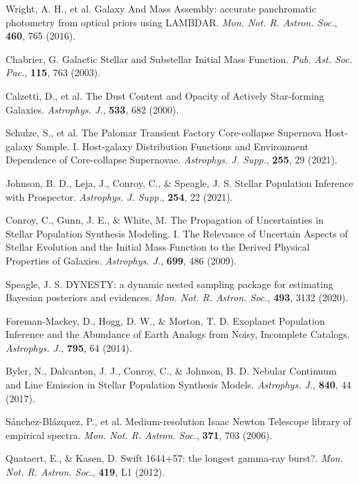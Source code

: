 \documentclass{nature_plusfigure}
\newcommand{\mn}{{Mon. Not. R. Astron. Soc.}}
\newcommand{\mnras}{\mn}
\newcommand{\apj}{{Astrophys. J.}}
\newcommand{\apjs}{{Astrophys. J. Supp.}}
\newcommand{\pasp}{{Pub. Ast. Soc. Pac.}}
\begin{document}
\begin{methods}
\begin{thebibliography}{10}
 
 Wright, A. H., et al. Galaxy And Mass Assembly: accurate panchromatic photometry from optical priors using LAMBDAR. \emph{\mnras}, \textbf{460}, 765 (2016). 
 
 Chabrier, G. Galactic Stellar and Substellar Initial Mass Function. \emph{\pasp}, \textbf{115}, 763 (2003). 

 Calzetti, D., et al. The Dust Content and Opacity of Actively Star-forming Galaxies. \emph{\apj}, \textbf{533}, 682 (2000). 

 Schulze, S., et al. The Palomar Transient Factory Core-collapse Supernova Host-galaxy Sample. I. Host-galaxy Distribution Functions and Environment Dependence of Core-collapse Supernovae. \emph{\apjs}, \textbf{255}, 29 (2021). 

 Johnson, B. D., Leja, J., Conroy, C., \& Speagle, J. S. Stellar Population Inference with Prospector. \emph{\apjs}, \textbf{254}, 22 (2021). 

 Conroy, C., Gunn, J. E., \& White, M. The Propagation of Uncertainties in Stellar Population Synthesis Modeling. I. The Relevance of Uncertain Aspects of Stellar Evolution and the Initial Mass Function to the Derived Physical Properties of Galaxies. \emph{\apj}, \textbf{699}, 486 (2009). 

 Speagle, J. S. DYNESTY: a dynamic nested sampling package for estimating Bayesian posteriors and evidences. \emph{\mnras}, \textbf{493}, 3132 (2020). 

 Foreman-Mackey, D., Hogg, D. W., \& Morton, T. D. Exoplanet Population Inference and the Abundance of Earth Analogs from Noisy, Incomplete Catalogs. \emph{\apj}, \textbf{795}, 64 (2014). 
 
 Byler, N., Dalcanton, J. J., Conroy, C., \& Johnson, B. D. Nebular Continuum and Line Emission in Stellar Population Synthesis Models. \emph{\apj}, \textbf{840}, 44 (2017). 

 Sánchez-Blázquez, P., et al. Medium-resolution Isaac Newton Telescope library of empirical spectra. \emph{\mnras}, \textbf{371}, 703 (2006). 
 

 Quataert, E., \& Kasen, D. Swift 1644+57: the longest gamma-ray burst?. \emph{\mnras}, \textbf{419}, L1 (2012). 


\end{thebibliography}
\end{methods}
\end{document}
